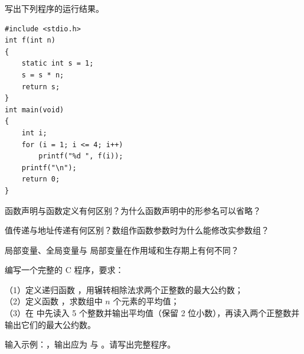 \documentclass[a4paper,11pt]{article}
\begin{document}
\q 写出下列程序的运行结果。
\begin{lstlisting}[language={[custom]C}]
#include <stdio.h>
int f(int n)
{
    static int s = 1;
    s = s * n;
    return s;
}
int main(void)
{
    int i;
    for (i = 1; i <= 4; i++)
        printf("%d ", f(i));
    printf("\n");
    return 0;
}
\end{lstlisting}
\anslines{2.6cm}

\q 函数声明与函数定义有何区别？为什么函数声明中的形参名可以省略？\anslines{3.0cm}

\q 值传递与地址传递有何区别？数组作函数参数时为什么能修改实参数组？\anslines{3.2cm}

\q 局部变量、全局变量与  局部变量在作用域和生存期上有何不同？\anslines{3.2cm}

\newpage
{}
\q 编写一个完整的 C 程序，要求：
\par\vspace{0.15em}
\noindent（1）定义递归函数 ，用辗转相除法求两个正整数的最大公约数；\\
\noindent（2）定义函数 ，求数组中 $n$ 个元素的平均值；\\
\noindent（3）在  中先读入 5 个整数并输出平均值（保留 2 位小数），再读入两个正整数并输出它们的最大公约数。

\noindent 输入示例：，输出应为  与 。请写出完整程序。\anslines{4.0cm}
\end{document}
